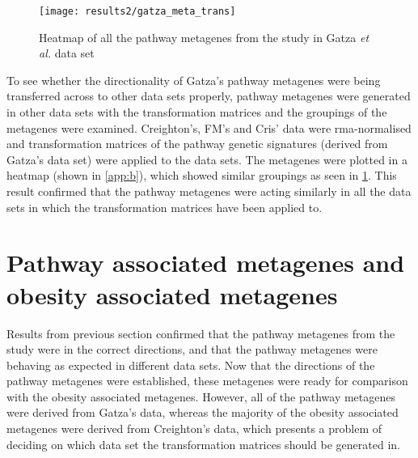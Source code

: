 \begin{figure}[htpb]
	\centering
	\texttt{[image: results2/gatza\_meta\_trans]}
	\caption{Heatmap of all the pathway metagenes from the \citet{Gatza2010a} study in Gatza \textit{et al.} data set}
	\label{fig:gatza_meta_dir}
\end{figure}

To see whether the directionality of Gatza's pathway metagenes were being transferred across to other data sets properly, pathway metagenes were generated in other data sets with the transformation matrices and the groupings of the metagenes were examined.
Creighton's, FM's and Cris' data were \gls{rma}-normalised and transformation matrices of the pathway genetic signatures (derived from Gatza's data set) were applied to the data sets.
The metagenes were plotted in a heatmap (shown in \cref{app:b}), which showed similar groupings  as seen in \cref{fig:gatza_meta_dir}.
This result confirmed that the pathway metagenes were acting similarly in all the data sets in which the transformation matrices have been applied to.


\section{Pathway associated metagenes and obesity associated metagenes}
\label{sec:pathway_associated_metagenes_and_obesity_associated_metagenes}

Results from previous section confirmed that the pathway metagenes from the \citet{Gatza2010a} study were in the correct directions, and that the pathway metagenes were behaving as expected in different data sets.
Now that the directions of the pathway metagenes were established, these metagenes were ready for comparison with the obesity associated metagenes.
However, all of the pathway metagenes were derived from Gatza's data, whereas the majority of the obesity associated metagenes were derived from Creighton's data, which presents a problem of deciding on which data set the transformation matrices should be generated in.

